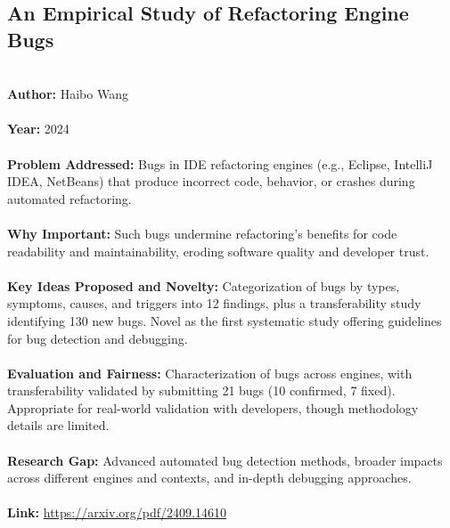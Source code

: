 \documentclass[12pt]{article}
\begin{document}
\subsection*{An Empirical Study of Refactoring Engine Bugs}
\\
\textbf{Author:} Haibo Wang \\
\\
\textbf{Year:} 2024 \\
\\
\textbf{Problem Addressed:} Bugs in IDE refactoring engines (e.g., Eclipse, IntelliJ IDEA, NetBeans) that produce incorrect code, behavior, or crashes during automated refactoring. \\
\\
\textbf{Why Important:} Such bugs undermine refactoring’s benefits for code readability and maintainability, eroding software quality and developer trust. \\
\\
\textbf{Key Ideas Proposed and Novelty:} Categorization of bugs by types, symptoms, causes, and triggers into 12 findings, plus a transferability study identifying 130 new bugs. Novel as the first systematic study offering guidelines for bug detection and debugging. \\
\\
\textbf{Evaluation and Fairness:} Characterization of bugs across engines, with transferability validated by submitting 21 bugs (10 confirmed, 7 fixed). Appropriate for real-world validation with developers, though methodology details are limited. \\
\\
\textbf{Research Gap:} Advanced automated bug detection methods, broader impacts across different engines and contexts, and in-depth debugging approaches. \\
\\
\textbf{Link:} \url{https://arxiv.org/pdf/2409.14610}
\pagebreak

\end{document}

